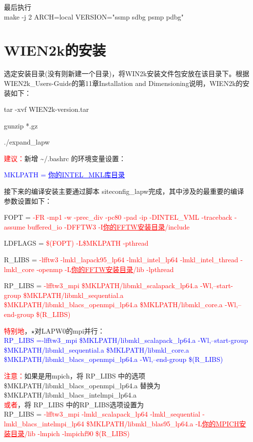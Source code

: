 \documentclass[10pt,a4paper]{article}
\newcommand{\upcite}[1]{\hspace{0ex}\textsuperscript{\cite{#1}}} %
\begin{document}
最后执行\\
\textrm{make -j 2 ARCH=local VERSION="ssmp sdbg psmp pdbg"}

\section{WIEN2k的安装}
选定安装目录(没有则新建一个目录)，将\textrm{WIN2k}安装文件包安放在该目录下。根据\textrm{WIEN2k\_Users-Guide}\upcite{WIEN2K-UG_2001}的第\textrm{11}章\textrm{Installation and Dimensioning}说明，\textrm{WIEN2k}的安装如下：

tar -xvf WIEN2k-version.tar

gunzip *.gz

./expand\_lapw

\textcolor{red}{建议：}新增 \~\//.bashrc 的环境变量设置：

\textcolor{blue}{MKLPATH = \underline{你的\textrm{INTEL\_MKL}库目录}}

接下来的编译安装主要通过脚本 \textrm{siteconfig\_lapw}完成，其中涉及的最重要的编译参数设置如下：

FOPT = \textcolor{red}{-FR -mp1 -w -prec\_div -pc80 -pad -ip -DINTEL\_VML -traceback -assume buffered\_io -DFFTW3 -I\underline{你的FFTW安装目录}/include}

LDFLAGS = \textcolor{red}{\$(FOPT) -L\${MKLPATH} -pthread}

R\_LIBS = \textcolor{red}{-lfftw3\; -lmkl\_lapack95\_lp64\; -lmkl\_intel\_lp64\; -lmkl\_intel\_thread\; -lmkl\_core\; -openmp\; -L\underline{你的FFTW安装目录}/lib\; -lpthread}

RP\_LIBS = \textcolor{red}{-lfftw3\_mpi\; \${MKLPATH}/libmkl\_scalapack\_lp64.a\; -Wl,--start-group\; \${MKLPATH}/libmkl\_sequential.a\; \${MKLPATH}/libmkl\_blacs\_openmpi\_lp64.a\; \${MKLPATH}/libmkl\_core.a\; -Wl,--end-group\/ \$(R\_LIBS)}

\textcolor{red}{特别地}，$\star$对\textrm{LAPW0}的\textrm{mpi}并行：\\
 \textcolor{blue}{RP\_LIBS =-lfftw3\_mpi\; \${MKLPATH}/libmkl\_scalapack\_lp64.a\; -Wl,--start-group\; \${MKLPATH}/libmkl\_sequential.a\; \${MKLPATH}/libmkl\_core.a\; \${MKLPATH}/libmkl\_blacs\_openmpi\_lp64.a\; -Wl,--end-group\/ \$(R\_LIBS)}

\textcolor{red}{注意：}如果是用mpich，将 \textrm{ RP\_LIBS } 中的选项\\
\${MKLPATH}/libmkl\_blacs\_openmpi\_lp64.a 替换为\\
\${MKLPATH}/libmkl\_blacs\_intelmpi\_lp64.a \\
\textcolor{red}{或者}，将 \textrm{ RP\_LIBS } 中的\textrm{RP\_LIBS}选项设置为\\
RP\_LIBS = \textcolor{red}{-lfftw3\_mpi\; -lmkl\_scalapack\_lp64\; -lmkl\_sequential\; -lmkl\_blacs\_intelmpi\_lp64\; \${MKLPATH}/libmkl\_blas95\_lp64.a\; -L\underline{你的MPICH安装目录}/lib\; -lmpich\; -lmpichf90\/ \$(R\_LIBS)}
\end{document}
